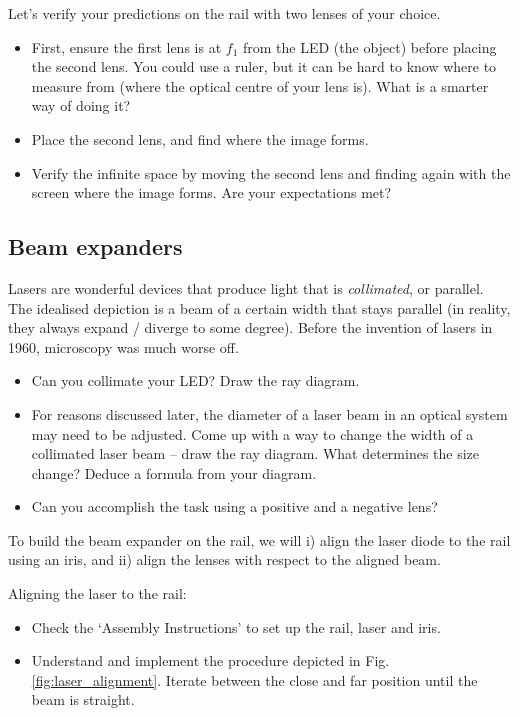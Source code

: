 \documentclass[a4paper]{report}
\begin{document}
    \noindent
	Let's verify your predictions on the rail with two lenses of your choice.

	\begin{itemize}
	    \item First, ensure the first lens is at $f_1$ from the LED (the object) before placing the second lens. You could use a ruler, but it can be hard to know where to measure from (where the optical centre of your lens is). What is a smarter way of doing it?
	    \item Place the second lens, and find where the image forms.
	    \item Verify the infinite space by moving the second lens and finding again with the screen where the image forms. Are your expectations met?
	\end{itemize}




	\subsection{Beam expanders}
	\hypertarget{hintBack-expand}{}

	Lasers are wonderful devices that produce light that is \emph{collimated}, or parallel. The idealised depiction is a beam of a certain width that stays parallel (in reality, they always expand / diverge to some degree). Before the invention of lasers in 1960, microscopy was much worse off.

    \begin{itemize}
        \item Can you collimate your LED? Draw the ray diagram.
		\item For reasons discussed later, the diameter of a laser beam in an optical system may need to be adjusted. Come up with a way to change the width of a collimated laser beam -- draw the ray diagram. What determines the size change? Deduce a formula from your diagram.
	    \item Can you accomplish the task using a positive and a negative lens?
	\end{itemize}

    \noindent
	To build the beam expander on the rail, we will i) align the laser diode to the rail using an iris, and ii) align the lenses with respect to the aligned beam.


    \noindent
	Aligning the laser to the rail:
	\begin{itemize}
	    \item Check the `Assembly Instructions' to set up the rail, laser and iris.
	    \item Understand and implement the procedure depicted in Fig. \ref{fig:laser_alignment}. Iterate between the close and far position until the beam is straight.
	\end{itemize}
\end{document}
